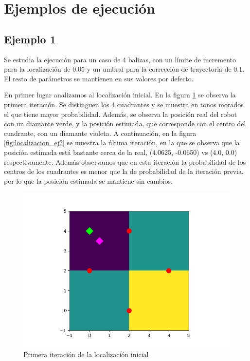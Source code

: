 \section{Ejemplos de ejecución}
\subsection{Ejemplo 1}
Se estudia la ejecución para un caso de 4 balizas, con un límite de incremento para la localización de 0.05 y un umbral para la corrección de trayectoria de 0.1. El resto de parámetros se mantienen en sus valores por defecto.

\bigskip En primer lugar analizamos al localización inicial. En la figura \ref{fig:localizacion_ej1} se observa la primera iteración. Se distinguen los 4 cuadrantes y se muestra en tonos morados el que tiene mayor probabilidad.
Además, se observa la posición real del robot con un diamante verde, y la posición estimada, que corresponde con el centro del cuadrante, con un diamante violeta.
A continuación, en la figura \ref{fig:localizacion_ej2} se muestra la última iteración, en la que se observa que la posición estimada está bastante cerca de la real, (4.0625, -0.0650) vs (4.0, 0.0) respectivamente. Además observamos que en esta iteración la probabilidad de los centros de los cuadrantes es menor que la de probabilidad de la iteración previa, por lo que la posición estimada se mantiene sin cambios.
\begin{figure}[htb]
  \centering
  \includegraphics[width=1\linewidth]{images/localizacion7.png}
  \caption{Primera iteración de la localización inicial}
  \label{fig:localizacion_ej1}
\end{figure}
